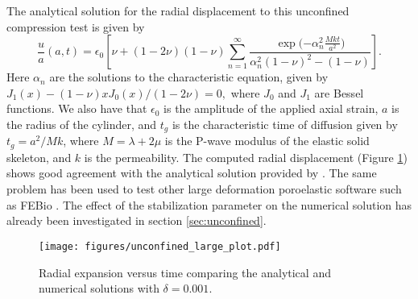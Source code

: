 The analytical solution for the radial displacement to this unconfined compression test is given by
\begin{equation}
 \frac{u}{a}(a,t)=\epsilon_{0}
 \left[ \nu + (1-2\nu)(1-\nu) \sum^{\infty}_{n=1}
        \frac{\exp{( -\alpha_n^{2} \frac{Mkt}{a^{2}}})}{\alpha_{n}^{2}(1-\nu)^{2}-(1-\nu)}  \right].
\end{equation}
Here $\alpha_n$ are the solutions to the characteristic equation, given by $J_{1}(x)-(1-\nu)xJ_{0}(x)/(1-2\nu)=0,$ where $J_{0}$ and $J_{1}$ are Bessel functions. We also have that $\epsilon_{0}$ is the amplitude of the applied axial strain, $a$ is the radius of the cylinder, and $t_{g}$ is the characteristic time of diffusion given by $t_{g}= a^{2}/M k$, where $M=\lambda + 2\mu$ is the P-wave modulus of the elastic solid skeleton, and $k$ is the permeability. The computed radial displacement (Figure \ref{fig:anal_unconfined_plot}) shows good agreement with the analytical solution provided by \cite{armstrong1984analysis}. The same problem has  been used to test other large deformation poroelastic software such as FEBio \cite{maas2012febio}. The effect of the stabilization parameter on the numerical solution has already been investigated in section \ref{sec:unconfined}.


\begin{figure}[h]
\begin{center}
\texttt{[image: figures/unconfined\_large\_plot.pdf]}
\caption{Radial expansion versus time comparing the analytical and numerical solutions with $\delta=0.001$.}
\label{fig:anal_unconfined_plot}
\end{center}
\end{figure}


